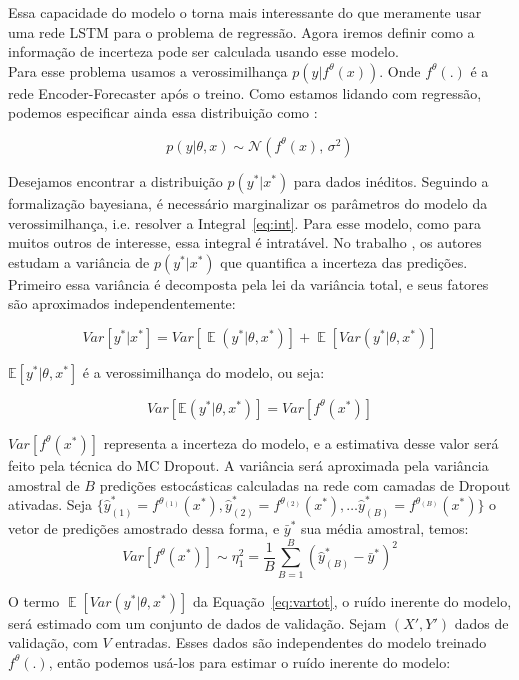 Essa capacidade do modelo o torna mais interessante do que meramente usar uma
rede LSTM para o problema de regressão. Agora iremos definir como a informação
de incerteza pode ser calculada usando esse modelo. \\

Para esse problema usamos a verossimilhança $p(y |f^\theta(x))$.
Onde $f^\theta(.)$ é a rede Encoder-Forecaster após o treino.
Como estamos lidando com regressão, podemos especificar ainda essa distribuição
como \citep{ubertime}:  

\begin{equation}
  \label{eq:reg}
 p(y| \theta,x) \sim \mathcal{N}(f^{\theta}(x),\,\sigma^2)
\end{equation}

Desejamos encontrar a distribuição $p(y^*| x^*)$ para dados inéditos. Seguindo
a formalização bayesiana, é necessário marginalizar os parâmetros do modelo da
verossimilhança, i.e. resolver a Integral~\ref{eq:int}. Para esse modelo, como
para muitos outros de interesse, essa integral é intratável. No trabalho
\citep{ubertime}, os autores estudam a variância de $p(y^{*} | x^{*})$ que
quantifica a incerteza das predições. Primeiro essa variância é decomposta pela
lei da variância total, e seus fatores são aproximados independentemente: 

\begin{equation}
   Var[y^* | x^*] = Var[\mathop{\mathbb{E}}(y^* | \theta,x^*)] + \mathop{\mathbb{E}}[Var(y^* | \theta,x^*)]
   \label{eq:vartot}
 \end{equation}

$\mathbb{E}[y^* | \theta,x^*]$ é a verossimilhança do modelo, ou seja:

\[
  Var[\mathbb{E}(y^* | \theta,x^*)] = Var[f^\theta(x^*)]
\]

$Var[f^\theta(x^*)]$ representa a incerteza do modelo, e a estimativa desse valor será feito pela técnica do MC Dropout. A variância
será aproximada pela variância amostral de $B$ predições estocásticas calculadas
na rede com camadas de Dropout ativadas. Seja $\{\hat{y}^*_{(1)}=f^{\theta_{(1)}}(x^*),\hat{y}^*_{(2)}=f^{\theta_{(2)}}(x^*), \dots
\hat{y}^*_{(B)}=f^{\theta_{(B)}}(x^*)\}$ o vetor de predições amostrado dessa forma, e $\bar{y}^*$ sua
média amostral, temos: \\

\[   Var[f^\theta(x^*)] \sim \eta_1^2 = \frac{1}{B}\sum^B_{B=1}(\hat{y}^*_{(B)} - \bar{y}^*)^2  \]

O termo $\mathop{\mathbb{E}}[Var(y^* | \theta,x^*)]$ da Equação~\ref{eq:vartot}, o
ruído inerente do modelo, será estimado com um conjunto de dados de validação.
Sejam $(X',Y')$ dados de validação, com
$V$ entradas. Esses dados são independentes do modelo
treinado $f^\theta(.)$, então podemos usá-los para estimar o ruído inerente do
modelo: \\

